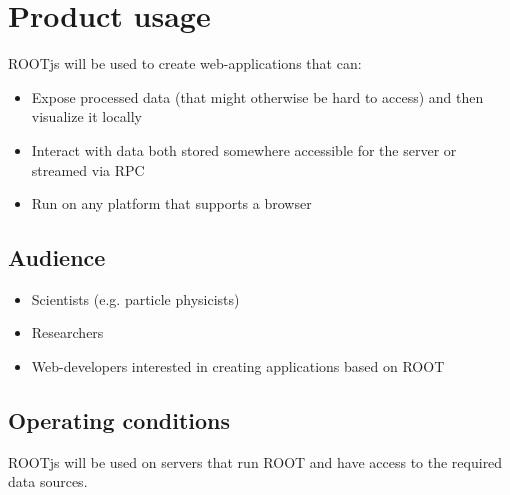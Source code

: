 \chapter{Product usage}

ROOTjs will be used to create web-applications that can:
\begin{itemize}
	\item Expose processed data (that might otherwise be hard to access) and then visualize it locally
	\item Interact with data both stored somewhere accessible for the server or streamed via RPC
	\item Run on any platform that supports a browser
\end{itemize}


\section{Audience}
\begin{itemize}
	\item Scientists (e.g. particle physicists)
	\item Researchers
	\item Web-developers interested in creating applications based on ROOT
\end{itemize}

\section{Operating conditions}

ROOTjs will be used on servers that run ROOT and have access to the required data sources.
